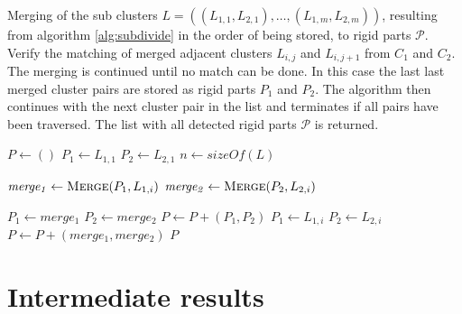 \begin{algorithm}[tbp]
	\caption{Merging of the sub clusters $\mathit{L} = ((L_{1,1}, L_{2,1}),\ldots,(L_{1,m}, L_{2,m}))$, resulting from algorithm \ref{alg:subdivide} in the order of being stored, to rigid parts $\mathcal{P}$. Verify the matching of merged adjacent clusters $L_{i,j}$ and $L_{i,j+1}$ from $C_1$ and $C_2$. The merging is continued until no match can be done. In this case the last last merged cluster pairs are stored as rigid parts $P_1$ and $P_2$. The algorithm then continues with the next cluster pair in the list and terminates if all pairs have been traversed. The list with all detected rigid parts $\mathcal{P}$ is returned.}
	\label{alg:merging}
	
	\begin{algorithmic}[1]     %
		\label{merging}

		\State $P \gets ()$
		\State $P_1 \gets L_{1,1}$
		\State $P_2 \gets L_{2,1}$
		\State $n \gets \mathit{sizeOf}(L)$
		
		\State $\mathit{merge_1} \gets \Call{Merge}{P_1, L_{1,i}}$
		\State $\mathit{merge_2} \gets \Call{Merge}{P_2, L_{2,i}}$
		
		\State $\mathit{P_1} \gets merge_1$
		\State $\mathit{P_2} \gets merge_2$
		\Else
		\State $P \gets P + (P_1, P_2)$
		\State $P_1 \gets L_{1,i}$
		\State $P_2 \gets L_{2,i}$
		\EndIf
		\EndFor
		\State $P \gets P + (merge_1, merge_2)$
		\State\Return $P$
		\EndProcedure	
	\end{algorithmic}
\end{algorithm}

\section{Intermediate results}

